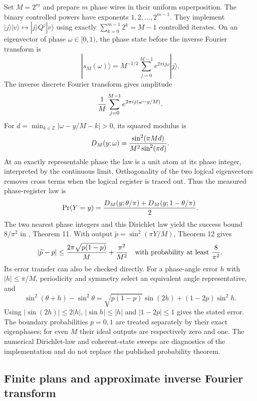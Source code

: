 Set $M=2^m$ and prepare $m$ phase wires in their uniform superposition.
The binary controlled powers have exponents $1,2,\ldots,2^{m-1}$. They
implement $|j\rangle|v\rangle\mapsto|j\rangle Q^j|v\rangle$ using exactly
$\sum_{k=0}^{m-1}2^k=M-1$ controlled iterates. On an eigenvector of phase
$\omega\in[0,1)$, the phase state before the inverse Fourier transform is
\[
 |s_M(\omega)\rangle=M^{-1/2}\sum_{j=0}^{M-1}
 e^{2\pi i j\omega}|j\rangle.
\]
The inverse discrete Fourier transform gives amplitude
\[
 {1\over M}\sum_{j=0}^{M-1}e^{2\pi i j(\omega-y/M)}.
\]
For $d=\min_{k\in\mathbb Z}|\omega-y/M-k|>0$, its squared modulus is
\[
 D_M(y;\omega)={\sin^2(\pi M d)\over M^2\sin^2(\pi d)}.
\]
At an exactly representable phase the law is a unit atom at its phase
integer, interpreted by the continuous limit. Orthogonality of the two
logical eigenvectors removes cross terms when the logical register is
traced out. Thus the measured phase-register law is
\begin{equation}
 \Pr(Y=y)={D_M(y;\theta/\pi)+D_M(y;1-\theta/\pi)\over2}.
 \label{eq:qpe-dirichlet-mixture}
\end{equation}
The two nearest phase integers and this Dirichlet law yield the success
bound $8/\pi^2$ in \citet{brassard}, Theorem 11. With output
$\widetilde p=\sin^2(\pi Y/M)$, Theorem 12 gives
\begin{equation}
 |\widetilde p-p|\leq {2\pi\sqrt{p(1-p)}\over M}
                         +{\pi^2\over M^2}
 \quad\hbox{with probability at least }{8\over\pi^2}.
 \label{eq:qpe-published-amplitude-bound}
\end{equation}
Its error transfer can also be checked directly. For a phase-angle error
$h$ with $|h|\leq\pi/M$, periodicity and symmetry select an equivalent
angle representative, and
\[
 \sin^2(\theta+h)-\sin^2\theta
 =\sqrt{p(1-p)}\sin(2h)+(1-2p)\sin^2h.
\]
Using $|\sin(2h)|\leq2|h|$, $|\sin h|\leq|h|$ and
$|1-2p|\leq1$ gives the stated error. The boundary probabilities $p=0,1$
are treated separately by their exact eigenphases; for even $M$ their ideal
outputs are respectively zero and one. The numerical Dirichlet-law and
coherent-state sweeps are diagnostics of the implementation and do not
replace the published probability theorem.

\subsection{Finite plans and approximate inverse Fourier transform}

